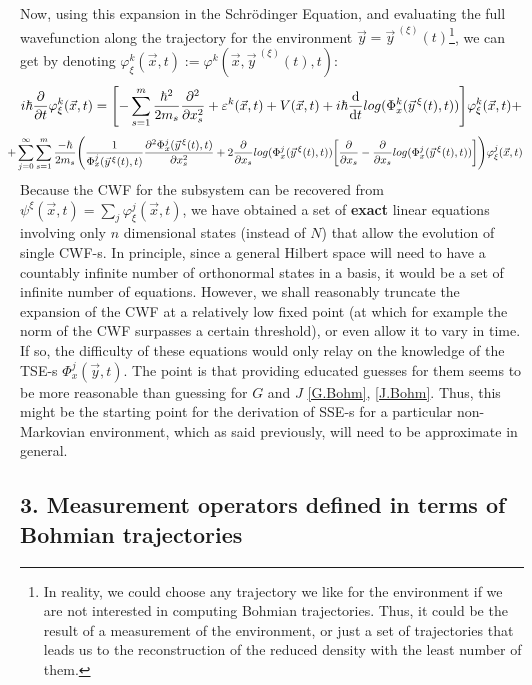 \documentclass[11pt, a4paper]{article} %
\begin{document}
Now, using this expansion in the Schrödinger Equation, and evaluating the full wavefunction along the trajectory for the environment $\vec{y}=\vec{y}^{\:(\xi)}(t)$\footnote{In reality, we could choose any trajectory we like for the environment if we are not interested in computing Bohmian trajectories. Thus, it could be the result of a measurement of the environment, or just a set of trajectories that leads us to the reconstruction of the reduced density with the least number of them.}, we can get by denoting $\varphi^k_\xi(\vec{x},t):=\varphi^k(\vec{x},\vec{y}^{\:(\xi)}(t),t)$:
\begin{equation}
 i\hbar\pdv{}{t}\varphi^k_\xi(\vec{x},t)=\qty[-\sum_{s=1}^m\frac{\hbar^2}{2m_s}\pdv[2]{}{x_s}+ \varepsilon^k(\vec{x},t)+V(\vec{x},t)   +i\hbar \dv{}{t}log(\Phi^k_x(\vec{y}^{\, \xi}(t),t))]\varphi^k_\xi(\vec{x},t)+
\end{equation}
$$
\hspace{-0.4cm}+\sum_{j=0}^\infty\sum_{s=1}^m \frac{-\hbar}{2m_s}\qty( \frac{1}{\Phi^j_x(\vec{y}^{\, \xi}(t),t)}\pdv[2]{\Phi^j_x(\vec{y}^{\, \xi}(t),t)}{x_s}+2\pdv{}{x_s}log(\Phi^j_x(\vec{y}^{\, \xi}(t),t))\qty[\pdv{}{x_s}-\pdv{}{x_s}log(\Phi^j_x(\vec{y}^{\, \xi}(t),t))] )\varphi^j_\xi(\vec{x},t)
$$
Because the CWF for the subsystem can be recovered from $\psi^\xi(\vec{x},t)=\sum_j \varphi^j_\xi(\vec{x},t)$, we have obtained a set of {\bf exact} linear equations involving only $n$ dimensional states (instead of $N$) that allow the evolution of single CWF-s. In principle, since a general Hilbert space will need to have a countably infinite number of orthonormal states in a basis, it would be a set of infinite number of equations. However, we shall reasonably truncate the expansion of the CWF at a relatively low fixed point (at which for example the norm of the CWF surpasses a certain threshold), or even allow it to vary in time. If so, the difficulty of these equations would only relay on the knowledge of the TSE-s $\Phi^j_x(\vec{y},t)$. The point is that providing educated guesses for them seems to be more reasonable than guessing for $G$ and $J$ \eqref{G.Bohm}, \eqref{J.Bohm}. Thus, this might be the starting point for the derivation of SSE-s for a particular non-Markovian environment, which as said previously, will need to be approximate in general.  \vspace{-0.2cm}

 
\subsection*{3. Measurement operators defined in terms of Bohmian trajectories}
\end{document}

